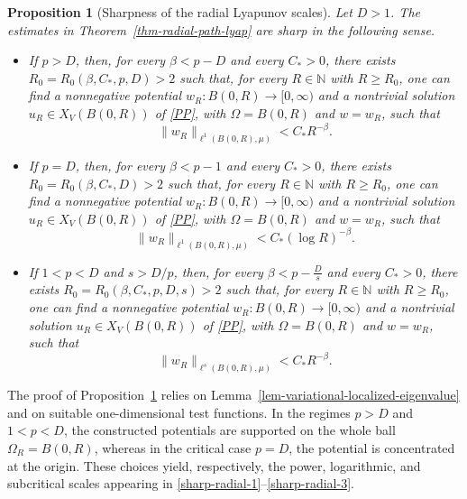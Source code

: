 \documentclass[twoside,12pt,letter]{article}
\theoremstyle{plain}
\newtheorem{proposition}[theorem]{Proposition}
\theoremstyle{definition}
\theoremstyle{remark}
\numberwithin{equation}{section}
\begin{document}
\begin{proposition}[Sharpness of the radial Lyapunov scales]
\label{prop-radial-path-sharp}
Let \(D>1\). The estimates in Theorem~\ref{thm-radial-path-lyap} are sharp in
the following sense.
\begin{itemize}
\item[{\rm(i)}] If \(p>D\), then, for every \(\beta<p-D\) and every
\(C_*>0\), there exists \(R_0=R_0(\beta,C_*,p,D)>2\) such that, for every
\(R\in\mathbb{N}\) with \(R\ge R_0\), one can find a nonnegative potential
\(w_R:B(0,R)\to[0,\infty)\) and a nontrivial solution
\(u_R\in X_V(B(0,R))\) of \eqref{PP}, with \(\Omega=B(0,R)\) and \(w=w_R\),
such that
\begin{equation}\label{sharp-radial-1}
\|w_R\|_{\ell^1(B(0,R),\mu)}
<
C_* R^{-\beta}.
\end{equation}

\item[{\rm(ii)}] If \(p=D\), then, for every \(\beta<p-1\) and every
\(C_*>0\), there exists \(R_0=R_0(\beta,C_*,D)>2\) such that, for every
\(R\in\mathbb{N}\) with \(R\ge R_0\), one can find a nonnegative potential
\(w_R:B(0,R)\to[0,\infty)\) and a nontrivial solution
\(u_R\in X_V(B(0,R))\) of \eqref{PP}, with \(\Omega=B(0,R)\) and \(w=w_R\),
such that
\begin{equation}\label{sharp-radial-2}
\|w_R\|_{\ell^1(B(0,R),\mu)}
<
C_* (\log R)^{-\beta}.
\end{equation}

\item[{\rm(iii)}] If \(1<p<D\) and \(s>D/p\), then, for every
\(\beta<p-\frac{D}{s}\) and every \(C_*>0\), there exists
\(R_0=R_0(\beta,C_*,p,D,s)>2\) such that, for every
\(R\in\mathbb{N}\) with \(R\ge R_0\), one can find a nonnegative potential
\(w_R:B(0,R)\to[0,\infty)\) and a nontrivial solution
\(u_R\in X_V(B(0,R))\) of \eqref{PP}, with \(\Omega=B(0,R)\) and \(w=w_R\),
such that
\begin{equation}\label{sharp-radial-3}
\|w_R\|_{\ell^s(B(0,R),\mu)}
<
C_* R^{-\beta}.
\end{equation}
\end{itemize}
\end{proposition}

The proof of Proposition~\ref{prop-radial-path-sharp} relies on
Lemma~\ref{lem-variational-localized-eigenvalue} and on suitable
one-dimensional test functions. In the regimes \(p>D\) and \(1<p<D\), the
constructed potentials are supported on the whole ball \(\Omega_R=B(0,R)\),
whereas in the critical case \(p=D\), the potential is concentrated at the
origin. These choices yield, respectively, the power, logarithmic, and
subcritical scales appearing in \eqref{sharp-radial-1}--\eqref{sharp-radial-3}.
\end{document}
